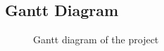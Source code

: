 \subsection{Gantt Diagram}
\begin{figure}[hbtp] 
	\centering
	\caption{Gantt diagram of the project}
	\label{GanttDiagram}
\end{figure}


